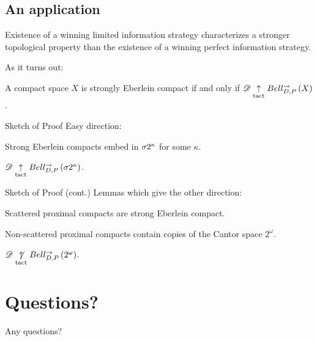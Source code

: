 \documentclass{beamer}
\theoremstyle{definition}
\begin{document}
\subsection{An application}

\begin{frame}
  Existence of a winning limited information strategy characterizes a
  stronger topological property than the existence of a winning perfect
  information strategy.

  \vpause

  As it turns out:

  \begin{theorem}
    A compact space $X$ is strongly Eberlein compact if and only if
    $\mathscr{D}\underset{\text{tact}}{\uparrow}Bell_{D,P}^{\to}\left({X}\right)$.
  \end{theorem}
\end{frame}

\begin{frame}{Sketch of Proof}
  Easy direction:

  \begin{definition}
    Strong Eberlein compacts embed in $\sigma2^{\kappa}$ for
    some $\kappa$.
  \end{definition}

  \begin{lemma}
    $\mathscr{D}\underset{\text{tact}}{\uparrow}Bell_{D,P}^{\to}\left({\sigma2^{\kappa}}\right)$.
  \end{lemma}
\end{frame}

\begin{frame}{Sketch of Proof (cont.)}
  Lemmas which give the other direction:

  \begin{lemma}
    Scattered proximal compacts are strong Eberlein compact.
  \end{lemma}

  \begin{lemma}
    Non-scattered proximal compacts contain copies of the Cantor space
    $2^\omega$.
  \end{lemma}

  \begin{lemma}
    $\mathscr{D}\underset{\text{tact}}{\not\uparrow}Bell_{D,P}^{\to}\left({2^\omega}\right)$.
  \end{lemma}
\end{frame}





\section{Questions?}

\begin{frame}
  Any questions?
\end{frame}


\begin{frame}[allowframebreaks]
  \tiny
  
  
\end{frame}
\end{document}
